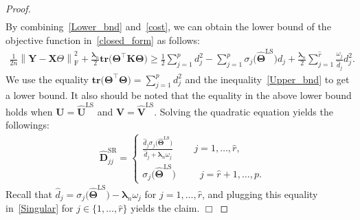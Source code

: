 \documentclass[alpha-refs]{wiley-article}
\begin{document}
\begin{proof}
\begin{align}
\end{align}
By combining~\eqref{Lower_bnd} and~\eqref{cost}, we can obtain the lower bound of the objective function in~\eqref{closed_form} as follows:
\begin{align*}
    \frac{1}{2n} \left\| \boldsymbol{Y}-\boldsymbol{X}\Theta \right\|_{\text{F}}^{2} + \frac{\boldsymbol{\lambda}_{n}}{2} 
    \textbf{tr}\big(\boldsymbol{\Theta}^{\top} \boldsymbol{K} \boldsymbol{\Theta} \big) \geq
    \frac{1}{2} \sum_{j=1}^{p} d_{j}^2 - \sum_{j=1}^{p} \sigma_{j}\big( \widehat{\boldsymbol{\Theta}}^{\text{LS}} \big)d_{j}  + \frac{\boldsymbol{\lambda}_{n}}{2}\sum_{j=1}^{\widehat{r}} \frac{\omega_{j}}{\widehat{d}_{j}}d_{j}^2.
\end{align*}
We use the equality $\textbf{tr}\big(\boldsymbol{\Theta}^{\top}\boldsymbol{\Theta}\big)=\sum_{j=1}^{p}d_{j}^{2}$ and the inequality~\eqref{Upper_bnd} to get a lower bound.
It also should be noted that the equality in the above lower bound holds when $\boldsymbol{U}=\widehat{\boldsymbol{U}}^{\text{LS}}$ and $\boldsymbol{V}=\widehat{\boldsymbol{V}}^{\text{LS}}$.
Solving the quadratic equation yields the followings:
\begin{align} \label{Singular}
    &\widehat{\boldsymbol{D}}^{\text{SR}}_{jj} = 
    \begin{cases}
        \frac{\widehat{d}_{j}\sigma_{j}\big(\widehat{\boldsymbol{\Theta}}^{\text{LS}} \big) }{\widehat{d}_{j} + \boldsymbol{\lambda}_{n}\omega_{j}} 
        \qquad \, j = 1,\dots,\widehat{r}, \\
        \sigma_{j}\big(\widehat{\boldsymbol{\Theta}}^{\text{LS}} \big) 
        \qquad \,\,\, j = \widehat{r}+1,\dots,p. 
    \end{cases}
\end{align}
Recall that $\widehat{d}_{j}=\sigma_{j}\big(\widehat{\boldsymbol{\Theta}}^{\text{LS}} \big)-\boldsymbol{\lambda}_{n}\omega_{j}$ for $j=1,\dots,\widehat{r}$, 
and plugging this equality in~\eqref{Singular} for $j\in\{1,\dots,\widehat{r}\}$ yields the claim.
$\Box$
\end{proof}

\end{document}
